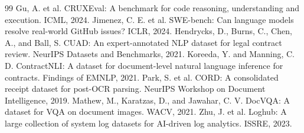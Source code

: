 \documentclass[10pt,twocolumn]{article}
\begin{document}
\begin{thebibliography}{99}
 Gu, A. et al. CRUXEval: A benchmark for code reasoning, understanding and execution. ICML, 2024.
 Jimenez, C. E. et al. SWE-bench: Can language models resolve real-world GitHub issues? ICLR, 2024.
 Hendrycks, D., Burns, C., Chen, A., and Ball, S. CUAD: An expert-annotated NLP dataset for legal contract review. NeurIPS Datasets and Benchmarks, 2021.
 Koreeda, Y. and Manning, C. D. ContractNLI: A dataset for document-level natural language inference for contracts. Findings of EMNLP, 2021.
 Park, S. et al. CORD: A consolidated receipt dataset for post-OCR parsing. NeurIPS Workshop on Document Intelligence, 2019.
 Mathew, M., Karatzas, D., and Jawahar, C. V. DocVQA: A dataset for VQA on document images. WACV, 2021.
 Zhu, J. et al. Loghub: A large collection of system log datasets for AI-driven log analytics. ISSRE, 2023.
\end{thebibliography}
\end{document}
